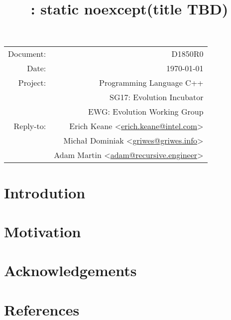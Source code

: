 \documentclass{article}
\title{\papernum: static noexcept(title TBD)}
\date{}
\author{}
\makeatletter
\newcommand{\erichemail}{erich.keane@intel.com}
\newcommand{\michalemail}{griwes@griwes.info}
\newcommand{\adamemail}{adam@recursive.engineer}
\newcommand{\email}[1]{\href{mailto:#1}{#1}}
\newcommand{\papernum}{D1850R0}
\makeatother
\begin{document}
\begin{flushright}
  \begin{tabular}{rr}
  Document:   &\papernum\\
  Date:       &\today\\
  Project:    &Programming Language C++\\
              &SG17: Evolution Incubator\\
              &EWG: Evolution Working Group\\
  Reply-to:   &Erich Keane \textless\email{\erichemail}\textgreater\\
              &Michał Dominiak \textless\email{\michalemail}\textgreater\\
              &Adam Martin \textless\email{\adamemail}\textgreater\\
  \end{tabular}
\end{flushright}

{\let\newpage\relax\maketitle} 
\maketitle\vspace{-1cm}

\section{Introdution}
\section{Motivation}
\section{Acknowledgements}
\section{References}
\end{document}
